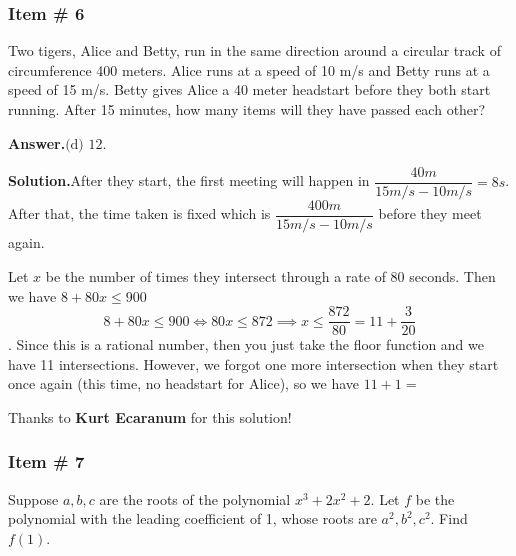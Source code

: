 \documentclass[11pt,paper=letter]{scrartcl}
\newcommand{\ans}[1]{{\sffamily \bfseries Answer.}\;\(\boxed{\text{#1}}\).}
\newcommand{\sol}{{\sffamily \bfseries Solution.}\;}
\newenvironment{rem}%
{\noindent \ignorespaces \small \sffamily  \sansmath {\bfseries \color{DarkMidnightBlue} Remark.}}%
{\ignorespacesafterend}
\newcommand{\joshbf}[1]{{\bfseries \sffamily \color{black} #1}}
\begin{document}
\subsubsection{Item \# 6}

\begin{probboxed}
Two tigers, Alice and Betty, run in the same direction around a circular track of circumference 400 meters. Alice runs at a speed of 10 m/s and Betty runs at a speed of 15 m/s. Betty gives Alice a 40 meter headstart before they both start running. After 15 minutes, how many items will they have passed each other?


\end{probboxed}

\ans{(d) 12}

\sol After they start, the first meeting will happen in $\dfrac{40m }{15m/s - 10m/s}= 8s$. After that, the time taken is fixed which is $\dfrac{400m}{15m/s - 10m/s}$ before they meet again.

\vspace{2mm}

Let $x$ be the number of times they intersect through a rate of 80 seconds. Then we have $8 + 80x \leq 900$ $$8 + 80x \leq 900 \Leftrightarrow 80x \leq872 \implies x \leq \dfrac{872}{80} = 11 + \dfrac{3}{20}  $$. Since this is a rational number, then you just take the floor function and we have 11 intersections. However, we forgot one more intersection when they start once again (this time, no headstart for Alice), so we have $11 + 1 =$ 


\begin{mdframed}
\begin{rem}
Thanks to \joshbf{Kurt Ecaranum} for this solution!
\end{rem}
\end{mdframed}


\subsubsection{Item \# 7}

\begin{probboxed}
Suppose $a,b,c$ are the roots of the polynomial $x^3 +2x^2 + 2$. Let $f$ be the polynomial with the leading coefficient of 1, whose roots are $a^2, b^2, c^2$. Find $f(1).$
   
\end{probboxed}
\end{document}
